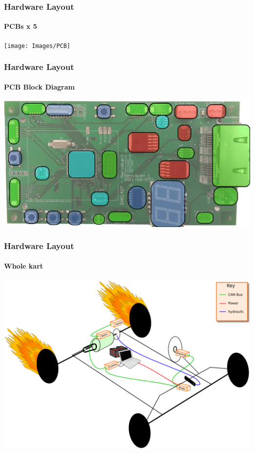 \documentclass{beamer}
\begin{document}
\begin{frame}
\frametitle{Hardware Layout}
\framesubtitle{PCBs x 5}
    \begin{center}
      \texttt{[image: Images/PCB]}
    \end{center}
\end{frame}

\begin{frame}
\frametitle{Hardware Layout}
\framesubtitle{PCB Block Diagram}
    \begin{center}
      \includegraphics[width=1\textwidth]{Images/PCB_diagram.pdf}
    \end{center}
\end{frame}

\begin{frame}
\frametitle{Hardware Layout}
\framesubtitle{Whole kart}
    \begin{center}
      \includegraphics[width=.95\textwidth]{Images/layout}
    \end{center}
\end{frame}
\end{document}
